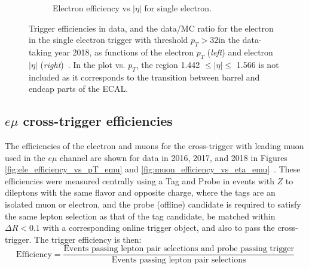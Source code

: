 \begin{figure}[ht]
\begin{subfigure}{0.45\textwidth}
        \caption{Electron efficiency vs $|\eta|$ for single electron.}
        \label{fig:single_ele_32GeV_efficiency_vs_eta}
    \end{subfigure}
    \caption[Trigger efficiencies in data and the data/MC ratio for the electron in the single electron trigger with threshold $p_{T} > 32$\GeV in the data-taking year 2018, as functions of the electron $p_{T}$ (\textit{left}) and electron $|\eta|$ (\textit{right}).]{Trigger efficiencies in data, and the data/MC ratio for the electron in the single electron trigger with threshold $p_{T} > 32$\GeV in the data-taking year 2018, as functions of the electron $p_{T}$ (\textit{left}) and electron $|\eta|$ (\textit{right})~\cite{CMS-DP-2020-016}. In the plot vs. $p_{T}$, the region 1.442 $\leq |\eta| \leq$ 1.566 is not included as it corresponds to the transition between barrel and endcap parts of the ECAL.} 
\end{figure}


\subsection{\texorpdfstring{$e\mu$}{emu} cross-trigger efficiencies}

The efficiencies of the electron and muons for the cross-trigger with leading muon used in the $e\mu$ channel are shown for data in 2016, 2017, and 2018 in Figures \ref{fig:ele_efficiency_vs_pT_emu} and \ref{fig:muon_efficiency_vs_eta_emu}~\cite{CMS-DP-2019-025}. These efficiencies were measured centrally using a Tag and Probe in events with $Z$ to dileptons with the same flavor and opposite charge, where the tags are an isolated muon or electron, and the probe (offline) candidate is required to satisfy the same lepton selection as that of the tag candidate, be matched within $\Delta R < 0.1$ with a corresponding online trigger object, and also to pass the cross-trigger. The trigger efficiency is then:
\begin{equation}
    \text{Efficiency} = \frac{\text{Events passing lepton pair selections and probe passing trigger}}{\text{Events passing lepton pair selections}}
\end{equation}


